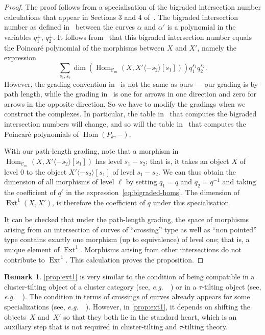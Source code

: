 \documentclass{amsart}
\theoremstyle{definition}
\newtheorem{remark}[theorem]{Remark}
\DeclareMathOperator{\Hom}{Hom} %
\DeclareMathOperator{\Ext}{Ext} %
\newcommand{\eg}{\textit{e.g.}~} %
\begin{document}
\begin{proof}
  The proof follows from a specialisation of the bigraded intersection number calculations that appear in Sections 3 and 4 of~\cite{kho.sei:02}.
  The bigraded intersection number as defined in~\cite[Sect.~3d]{kho.sei:02} between the curves \(\alpha\) and \(\alpha'\) is a polynomial in the variables \(q_1^{\pm}\), \(q_2^{\pm}\).
  It follows from~\cite[Prop.~4.9]{kho.sei:02} that this bigraded intersection number equals the Poincar{\'e} polynomial of the morphisms between \(X\) and \(X'\), namely the expression
  \begin{equation}
    \label{eq:bigraded-homs}
  \sum_{s_1,s_2}\dim(\Hom_{\mathcal{C}_m}(X,X'\langle -s_2 \rangle[s_1]))q_1^{s_1}q_2^{s_2}.    
\end{equation}
However, the grading convention in~\cite{kho.sei:02} is not the same as ours --- our grading is by path length, while the grading in~\cite{kho.sei:02} is one for arrows in one direction and zero for arrows in the opposite direction.
So we have to modify the gradings when we construct the complexes.
In particular, the table in~\cite[Lem.~3.20]{kho.sei:02} that computes the bigraded intersection numbers will change, and so will the table in~\cite[Lem.~4.12]{kho.sei:02} that computes the Poincar{\'e} polynomials of \(\Hom(P_k,-)\).

With our path-length grading, note that a morphism in \(\Hom_{\mathcal{C}_m}(X,X'\langle -s_2 \rangle[s_1])\) has level \(s_1 - s_2\); that is, it takes an object \(X\) of level \(0\) to the object \(X'\langle -s_2 \rangle[s_1]\) of level \(s_1 - s_2\).
  We can thus obtain the dimension of all morphisms of level \(\ell\) by setting \(q_1 = q\) and \(q_2 = q^{-1}\) and taking the coefficient of \(q^{\ell}\) in the expression~\eqref{eq:bigraded-homs}.
    The dimension of \(\Ext^1(X,X')\), is therefore the coefficient of \(q\) under this specialisation.

It can be checked that under the path-length grading, the space of morphisms arising from an intersection of curves of ``crossing'' type as well as ``non pointed'' type contains exactly one morphism (up to equivalence) of level one; that is, a unique element of \(\Ext^1\).
Morphisms arising from other intersections do not contribute to \(\Ext^1\).
This calculation proves the proposition.
\end{proof}

\begin{remark}
  \cref{prop:ext1} is very similar to the condition of being compatible in a cluster-tilting object of a cluster category (see, \eg~\cite[Cor.~4.3]{bua.mar.rei.ea:06}) or in a $\tau$-tilting object (see, \eg~\cite{AdachiIyamaReiten}).
  The condition in terms of crossings of curves already appears for some specializations (see, \eg~\cite{FominShapiroThurston, PaluPilaudPlamondon-surfaces}).
  However, in \cref{prop:ext1}, it depends on shifting the objects~\(X\) and~\(X'\) so that they both lie in the standard heart, which is an auxiliary step that is not required in cluster-tilting and $\tau$-tilting theory.
\end{remark}
\end{document}
